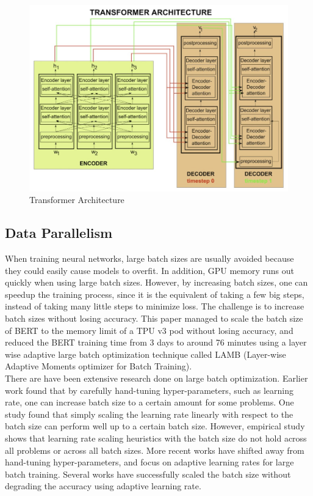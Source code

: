 \documentclass[conference]{IEEEtran}
\begin{document}
	\begin{figure}[!htbp]
		\centering
		\includegraphics[scale=0.26]{figures/figure7.png}
		\caption{\label{fig:my-label} Transformer Architecture \cite{transformer}}
	\end{figure}
	
	\subsection{Data Parallelism}
	When training neural networks, large batch sizes are usually avoided because they could easily cause models to overfit. In addition, GPU memory runs out quickly when using large batch sizes. However, by increasing batch sizes, one can speedup the training process, since it is the equivalent of taking a few big steps, instead of taking many little steps to minimize loss. The challenge is to increase batch sizes without losing accuracy. This paper \cite{LAMB} managed to scale the batch size of BERT to the memory limit of a TPU v3 pod without losing accuracy, and reduced the BERT training time from 3 days to around 76 minutes using a layer wise adaptive large batch optimization technique called LAMB (Layer-wise Adaptive Moments optimizer for Batch Training).\\
	
	There are have been extensive research done on large batch optimization. Earlier work found that by carefully hand-tuning hyper-parameters, such as learning rate, one can increase batch size to a certain amount for some problems. One study \cite{krizhevsky2014weird} found that simply scaling the learning rate linearly with respect to the batch size can perform well up to a certain batch size. However, empirical study \cite{shallue2019measuring} shows that learning rate scaling heuristics with the batch size do not hold across all problems or across all batch sizes. More recent works have shifted away from hand-tuning hyper-parameters, and focus on adaptive learning rates for large batch training. Several works have successfully scaled the batch size without degrading the accuracy using adaptive learning rate. \\
	
\end{document}
